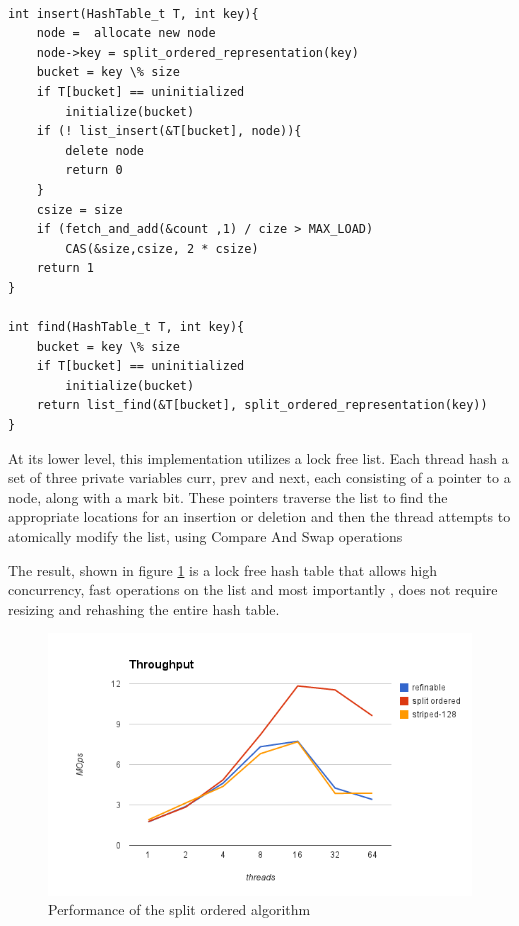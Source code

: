 \begin{lstlisting}[caption={Insert and Loopkup operations of the split ordered algorithm}]

int insert(HashTable_t T, int key){
	node =  allocate new node
	node->key = split_ordered_representation(key)
	bucket = key \% size
	if T[bucket] == uninitialized
		initialize(bucket)
	if (! list_insert(&T[bucket], node)){
		delete node
		return 0
	}
	csize = size
	if (fetch_and_add(&count ,1) / cize > MAX_LOAD)
		CAS(&size,csize, 2 * csize)
	return 1
}

int find(HashTable_t T, int key){
	bucket = key \% size
	if T[bucket] == uninitialized
		initialize(bucket)
	return list_find(&T[bucket], split_ordered_representation(key))
}

\end{lstlisting}

At its lower level, this implementation utilizes a lock free list. Each thread hash a set of three private variables curr, prev and next, each consisting of a pointer to a node, along with a mark bit. These pointers traverse the list to find the appropriate locations for an insertion or deletion and then the thread attempts to atomically modify the list, using Compare And Swap operations

The result, shown in figure \ref{hashes_split_ordered_perf} is a lock free hash table that allows high concurrency, fast operations on the list and most importantly , does not require resizing and rehashing the entire hash table.

\begin{figure}
 \centering
  \includegraphics[scale=0.7]{hashes_split_ordered_perf.png}
\caption{Performance of the split ordered algorithm}
\label{hashes_split_ordered_perf}
\end{figure}

